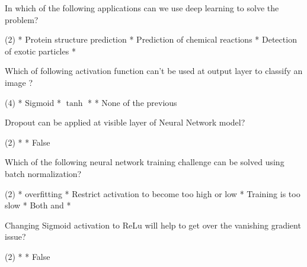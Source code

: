 \documentclass[11pt]{extarticle}
\begin{document}
\begin{exercise}
    In which of the following applications can we use deep learning to solve the problem?
    \begin{choice} (2)
        * Protein structure prediction
        * Prediction of chemical reactions
        * Detection of exotic particles
        * 
    \end{choice}
\end{exercise}
\begin{solution}
\end{solution}

\begin{exercise}
    Which of following activation function can't be used at output layer to classify an image ?
    \begin{choice} (4)
        * Sigmoid
        * \(\tanh\)
        * 
        * None of the previous
    \end{choice}
\end{exercise}
\begin{solution}
\end{solution}

\begin{exercise}
    Dropout can be applied at visible layer of Neural Network model?
    \begin{choice} (2)
        * 
        * False
    \end{choice}
\end{exercise}
\begin{solution}
\end{solution}

\begin{exercise}
    Which of the following neural network training challenge can be solved using batch normalization?
    \begin{choice} (2)
        * overfitting
        * Restrict activation to become too high or low
        * Training is too slow
        * Both  and 
        * 
    \end{choice}
\end{exercise}
\begin{solution}
\end{solution}

\begin{exercise}
    Changing Sigmoid activation to ReLu will help to get over the vanishing gradient issue?
    \begin{choice} (2)
        * 
        * False
    \end{choice}
\end{exercise}
\begin{solution}
\end{solution}
\end{document}
